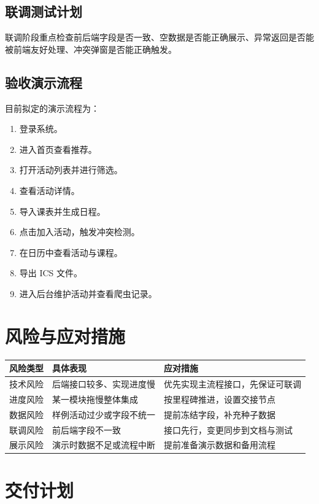 \documentclass[UTF8,a4paper,12pt,fontset=none]{ctexrep}
\begin{document}
\section{联调测试计划}
联调阶段重点检查前后端字段是否一致、空数据是否能正确展示、异常返回是否能被前端友好处理、冲突弹窗是否能正确触发。

\section{验收演示流程}
目前拟定的演示流程为：
\begin{enumerate}[leftmargin=2.5em]
\item 登录系统。
\item 进入首页查看推荐。
\item 打开活动列表并进行筛选。
\item 查看活动详情。
\item 导入课表并生成日程。
\item 点击加入活动，触发冲突检测。
\item 在日历中查看活动与课程。
\item 导出 ICS 文件。
\item 进入后台维护活动并查看爬虫记录。
\end{enumerate}

\chapter{风险与应对措施}
\begin{longtable}{|p{}|p{}|p{}|}
\hline
\textbf{风险类型} & \textbf{具体表现} & \textbf{应对措施} \\
\hline
技术风险 & 后端接口较多、实现进度慢 & 优先实现主流程接口，先保证可联调 \\
\hline
进度风险 & 某一模块拖慢整体集成 & 按里程碑推进，设置交接节点 \\
\hline
数据风险 & 样例活动过少或字段不统一 & 提前冻结字段，补充种子数据 \\
\hline
联调风险 & 前后端字段不一致 & 接口先行，变更同步到文档与测试 \\
\hline
展示风险 & 演示时数据不足或流程中断 & 提前准备演示数据和备用流程 \\
\hline
\end{longtable}

\chapter{交付计划}
\end{document}
